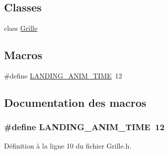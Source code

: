 \subsection*{Classes}
\begin{DoxyCompactItemize}
\item 
class \hyperlink{a00009}{Grille}
\end{DoxyCompactItemize}
\subsection*{Macros}
\begin{DoxyCompactItemize}
\item 
\#define \hyperlink{a00026_a7b620b1d77305e47aecb5e27e8a13d1e}{LANDING\_\-ANIM\_\-TIME}~12
\end{DoxyCompactItemize}


\subsection{Documentation des macros}
\hypertarget{a00026_a7b620b1d77305e47aecb5e27e8a13d1e}{
\subsubsection[{LANDING\_\-ANIM\_\-TIME}]{\setlength{\rightskip}{0pt plus 5cm}\#define LANDING\_\-ANIM\_\-TIME~12}}
\label{a00026_a7b620b1d77305e47aecb5e27e8a13d1e}


Définition à la ligne 10 du fichier Grille.h.

